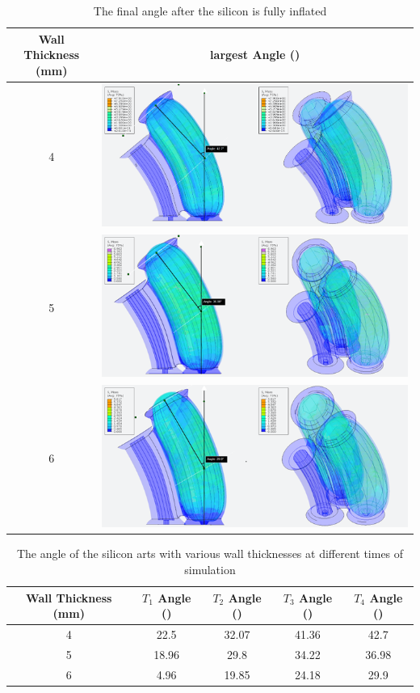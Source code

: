 \documentclass[twoside, 11pt]{article}
\begin{document}
\begin{table} [H]
	\centering
	\begin{tabular}{|c|c|}
	\hline
	Wall Thickness (mm) & largest Angle (\degree)\\\hline
	4 & \includegraphics[align=c, scale=0.6]{wall4}\\\hline
	5 & \includegraphics[align=c, scale=0.6]{wall5}\\\hline
	6 & \includegraphics[align=c, scale=0.6]{wall6}\\\hline
	\end{tabular}
	\caption{The final angle after the silicon is fully inflated}
\end{table}
\begin{table} [H]
	\centering
	\begin{tabular}{|c|c|c|c|c|}
	\hline
	Wall Thickness (mm) & $T_{1}$ Angle (\degree) & $T_{2}$ Angle (\degree) & $T_{3}$ Angle (\degree) & $T_{4}$ Angle (\degree)\\
	\hline
	4 & 22.5 & 32.07 & 41.36 & 42.7\\
	\hline
	5 & 18.96 & 29.8 & 34.22 & 36.98\\
	\hline
	6 & 4.96& 19.85 & 24.18 & 29.9\\
	\hline
	\end{tabular}
	\caption{The angle of the silicon arts with various wall thicknesses at different times of simulation}
\end{table}
\end{document}
